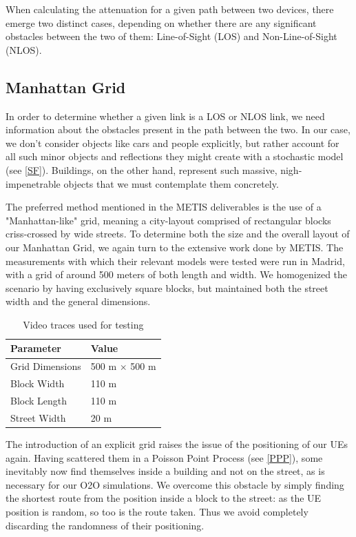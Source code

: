 When calculating the attenuation for a given path between two devices, there emerge two distinct cases, depending on whether there are any significant obstacles between the two of them: Line-of-Sight (LOS) and Non-Line-of-Sight (NLOS).



\subsection{Manhattan Grid} \label{mh_grid}
In order to determine whether a given link is a LOS or NLOS link, we need information about the obstacles present in the path between the two. In our case, we don't consider objects like cars and people explicitly, but rather account for all such minor objects and reflections they might create with a stochastic model (see \ref{SF}). Buildings, on the other hand, represent such massive, nigh-impenetrable objects that we must contemplate them concretely.

The preferred method mentioned in the METIS deliverables is the use of a "Manhattan-like" grid, meaning a city-layout comprised of rectangular blocks criss-crossed by wide streets. To determine both the size and the overall layout of our Manhattan Grid, we again turn to the extensive work done by METIS. The measurements with which their relevant models were tested were run in Madrid, with a grid of around 500 meters of both length and width. We homogenized the scenario by having exclusively square blocks, but maintained both the street width and the general dimensions.


\begin{table}[htbp]
\begin{center}
 \begin{tabular}{||p{3cm}|p{3cm}||} 
 \hline
 \textbf{Parameter} & \textbf{Value}\\
 \hline\hline
 Grid Dimensions & 500 m $\times$ 500 m \\ 
 \hline
 Block Width & 110 m \\
 \hline
 Block Length & 110 m \\
 \hline
 Street Width & 20 m \\
 \hline
\end{tabular}
\end{center}
\caption{Video traces used for testing}
\end{table}

The introduction of an explicit grid raises the issue of the positioning of our UEs again. Having scattered them in a Poisson Point Process (see \ref{PPP}), some inevitably now find themselves inside a building and not on the street, as is necessary for our O2O simulations. We overcome this obstacle by simply finding the shortest route from the position inside a block to the street: as the UE position is random, so too is the route taken. Thus we avoid completely discarding the randomness of their positioning.

